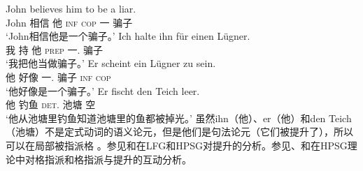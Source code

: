 \eal
\ex 
\gll John believes him to be a liar.\\
	 John 相信 他 \textsc{inf} \textsc{cop} 一 骗子\\
\glt `John相信他是一个骗子。'
\ex 
\gll Ich halte ihn für einen Lügner.\\
	我 持 他 \textsc{prep} 一.\acc{} 骗子\\
\glt `我把他当做骗子。'
\ex 
\gll Er scheint ein Lügner zu sein.\\
	 他 好像 一.\nom{} 骗子 \textsc{inf} \textsc{cop}\\
\glt `他好像是一个骗子。'	 
\ex 
\gll Er fischt den Teich leer.\\
	 他 钓鱼 \textsc{det}.\acc{} 池塘 空\\
\glt `他从池塘里钓鱼知道池塘里的鱼都被掉光。'
\zl
虽然ihn（他）、er（他）和den Teich（池塘）不是定式动词的语义论元，但是他们是句法论元（它们被提升了），所以可以在局部被指派格 。参见和在LFG\indexlfgc 和HPSG\indexhpsgc 对提升的分析。参见、和在HPSG理论中对格指派和格指派与提升的互动分析。

